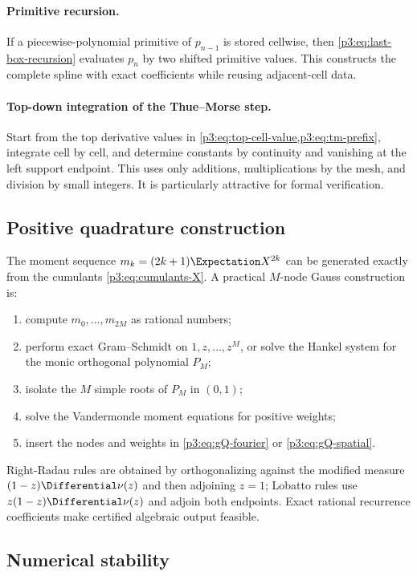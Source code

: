 \documentclass[11pt,oneside]{article}
\numberwithin{equation}{section}
\theoremstyle{definition}
\theoremstyle{remark}
\begin{document}
\paragraph{Primitive recursion.}
If a piecewise-polynomial primitive of $p_{n-1}$ is stored cellwise, then
\cref{p3:eq:last-box-recursion} evaluates $p_n$ by two shifted primitive values.  This
constructs the complete spline with exact coefficients while reusing adjacent-cell data.

\paragraph{Top-down integration of the Thue--Morse step.}
Start from the top derivative values in \cref{p3:eq:top-cell-value,p3:eq:tm-prefix}, integrate
cell by cell, and determine constants by continuity and vanishing at the left support
endpoint.  This uses only additions, multiplications by the mesh, and division by small
integers.  It is particularly attractive for formal verification.

\subsection{Positive quadrature construction}

The moment sequence $m_k=(2k+1)\Expectation X^{2k}$ can be generated exactly from the cumulants
\cref{p3:eq:cumulants-X}.  A practical $M$-node Gauss construction is:
\begin{enumerate}[leftmargin=2.1em]
\item compute $m_0,\ldots,m_{2M}$ as rational numbers;
\item perform exact Gram--Schmidt on $1,z,\ldots,z^M$, or solve the Hankel system for
      the monic orthogonal polynomial $P_M$;
\item isolate the $M$ simple roots of $P_M$ in $(0,1)$;
\item solve the Vandermonde moment equations for positive weights;
\item insert the nodes and weights in \cref{p3:eq:gQ-fourier} or
      \cref{p3:eq:gQ-spatial}.
\end{enumerate}
Right-Radau rules are obtained by orthogonalizing against the modified measure
$(1-z)\Differential\nu(z)$ and then adjoining $z=1$; Lobatto rules use
$z(1-z)\Differential\nu(z)$ and adjoin both endpoints.  Exact rational recurrence coefficients
make certified algebraic output feasible.

\subsection{Numerical stability}
\end{document}
